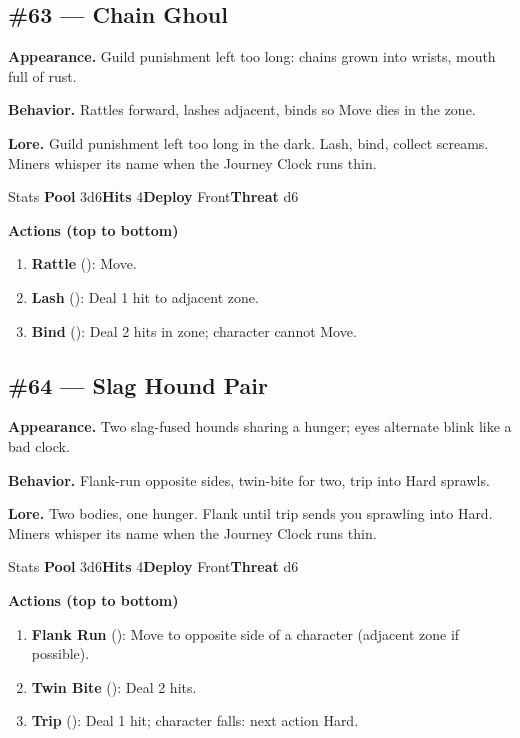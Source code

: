 \subsection*{\#63 --- Chain Ghoul}

\textbf{Appearance.} Guild punishment left too long: chains grown into wrists, mouth full of rust.

\textbf{Behavior.} Rattles forward, lashes adjacent, binds so Move dies in the zone.

\textbf{Lore.} Guild punishment left too long in the dark. Lash, bind, collect screams. Miners whisper its name when the Journey Clock runs thin.

\begin{monsterentry}{Stats}
\textbf{Pool} 3d6\quad\textbf{Hits} 4\quad\textbf{Deploy} Front\quad\textbf{Threat} d6

\textbf{Actions (top to bottom)}
\begin{enumerate}\setlength{\itemsep}{0.15em}\setlength{\parskip}{0pt}
  \item \textbf{Rattle} (\easy): Move.
  \item \textbf{Lash} (\medium): Deal 1 hit to adjacent zone.
  \item \textbf{Bind} (\hard): Deal 2 hits in zone; character cannot Move.
\end{enumerate}
\end{monsterentry}

\subsection*{\#64 --- Slag Hound Pair}

\textbf{Appearance.} Two slag-fused hounds sharing a hunger; eyes alternate blink like a bad clock.

\textbf{Behavior.} Flank-run opposite sides, twin-bite for two, trip into Hard sprawls.

\textbf{Lore.} Two bodies, one hunger. Flank until trip sends you sprawling into Hard. Miners whisper its name when the Journey Clock runs thin.

\begin{monsterentry}{Stats}
\textbf{Pool} 3d6\quad\textbf{Hits} 4\quad\textbf{Deploy} Front\quad\textbf{Threat} d6

\textbf{Actions (top to bottom)}
\begin{enumerate}\setlength{\itemsep}{0.15em}\setlength{\parskip}{0pt}
  \item \textbf{Flank Run} (\easy): Move to opposite side of a character (adjacent zone if possible).
  \item \textbf{Twin Bite} (\medium): Deal 2 hits.
  \item \textbf{Trip} (\hard): Deal 1 hit; character falls: next action Hard.
\end{enumerate}
\end{monsterentry}

